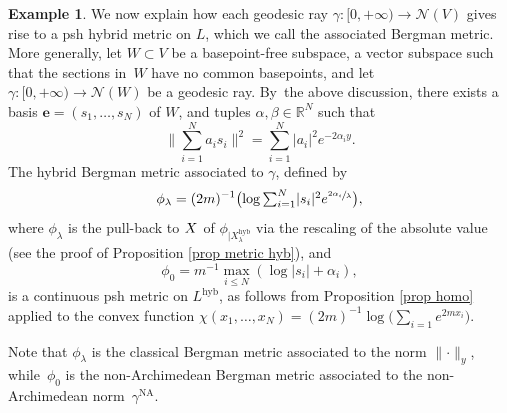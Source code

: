 \documentclass[JEP,XML,SOM,Unicode,published]{cedram}
\newcommand{\NoChangel}[1]{%
\expandafter\let\csname old\string#1\endcsname=#1
\let#1=\relax
\newcommand{#1}{\mathcode`l="716C\csname old\string#1\endcsname\mathcode`l="7160 }%
}
\let\ts\textstyle
\theoremstyle{definition}
\newtheorem{ex}[equation]{Example}
\newcommand \R{\mathbb R}
\newcommand{\hol}{\mathrm{hol}}\NoChangel{\hol}
\newcommand{\hyb}{\mathrm{hyb}}
\DeclareMathOperator{\NA}{NA}
\begin{document}
\begin{ex}
We now explain how each geodesic ray $\gamma: [0, + \infty) \to \mathcal{N}(V)$ gives rise to a psh hybrid metric on $L$, which we call the associated Bergman metric.
More generally, let $W \subset V$ be a basepoint-free subspace, \ie a vector subspace such that the sections in~$W$ have no common basepoints, and let $\gamma: [0, + \infty) \to \mathcal{N}(W)$ be a geodesic ray. By~the above discussion, there exists a basis $\boldsymbol{e} = (s_1,\dots, s_N)$ of $W$, and tuples $\alpha, \beta \in \R^N$ such that
\[
\biggl\lVert \sum_{i=1}^N a_i s_i \biggr\rVert^2 = \sum_{i=1}^N \lvert a_i \rvert^2 e^{-2\alpha_i y}.
\]
The hybrid Bergman metric associated to $\gamma$, defined by
\[
\phi_{\lambda} =(2m)^{-1}\bigl(\log \ts\sum_{i=1}^N \lvert s_i \rvert^2 e^{\sfrac{2\alpha_i}{\lambda}}\bigr),
\]
where $\phi_{\lambda}$ is the pull-back to $X^{\hol}$ of $\phi_{| X^{\hyb}_{\lambda}}$ via the rescaling of the absolute value (see the proof of Proposition \ref{prop metric hyb}), and
\[
\phi_{0} = m^{-1} \max_{i \le N} (\log \lvert s_i \rvert + \alpha_i),
\]
is a continuous psh metric on $L^{\hyb}$, as follows from Proposition \ref{prop homo} applied to the convex function $\chi(x_1,\dots,x_N) = (2m)^{-1} \log\bigl(\sum_{i=1} e^{2m x_i}\bigr).$

Note that $\phi_{\lambda}$ is the classical Bergman metric associated to the norm $\lVert \cdot \rVert_y$, while~$\phi_0$ is the non-Archimedean Bergman metric associated to the non-Archimedean norm~$\gamma^{\NA}$.
\end{ex}
\end{document}
